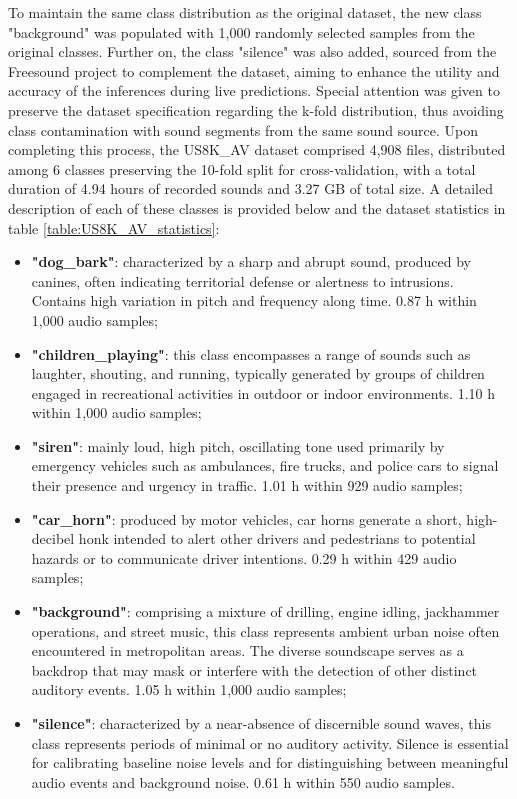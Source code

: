 To maintain the same class distribution as the original dataset, the new class "background" was populated with 1,000 randomly selected samples from the original classes. Further on, the class "silence" was also added, sourced from the Freesound project \cite{Font_freesound2013} to complement the dataset, aiming to enhance the utility and accuracy of the inferences during live predictions. Special attention was given to preserve the dataset specification regarding the k-fold distribution, thus avoiding class contamination with sound segments from the same sound source. Upon completing this process, the US8K\_AV dataset comprised 4,908 files, distributed among 6 classes preserving the 10-fold split for cross-validation, with a total duration of 4.94 hours of recorded sounds and 3.27 GB of total size. A detailed description of each of these classes is provided below and the dataset statistics in table \ref{table:US8K_AV_statistics}:

\begin{itemize}
    \item \textbf{"dog\_bark"}: characterized by a sharp and abrupt sound, produced by canines, often indicating territorial defense or alertness to intrusions. Contains high variation in pitch and frequency along time. 0.87 h within 1,000 audio samples;
    \item \textbf{"children\_playing"}: this class encompasses a range of sounds such as laughter, shouting, and running, typically generated by groups of children engaged in recreational activities in outdoor or indoor environments. 1.10 h within 1,000 audio samples;
    \item \textbf{"siren"}: mainly loud, high pitch, oscillating tone used primarily by emergency vehicles such as ambulances, fire trucks, and police cars to signal their presence and urgency in traffic. 1.01 h within 929 audio samples;
    \item \textbf{"car\_horn"}: produced by motor vehicles, car horns generate a short, high-decibel honk intended to alert other drivers and pedestrians to potential hazards or to communicate driver intentions. 0.29 h within 429 audio samples;
    \item \textbf{"background"}: comprising a mixture of drilling, engine idling, jackhammer operations, and street music, this class represents ambient urban noise often encountered in metropolitan areas. The diverse soundscape serves as a backdrop that may mask or interfere with the detection of other distinct auditory events. 1.05 h within 1,000 audio samples;
    \item \textbf{"silence"}: characterized by a near-absence of discernible sound waves, this class represents periods of minimal or no auditory activity. Silence is essential for calibrating baseline noise levels and for distinguishing between meaningful audio events and background noise. 0.61 h within 550 audio samples.
\end{itemize}


